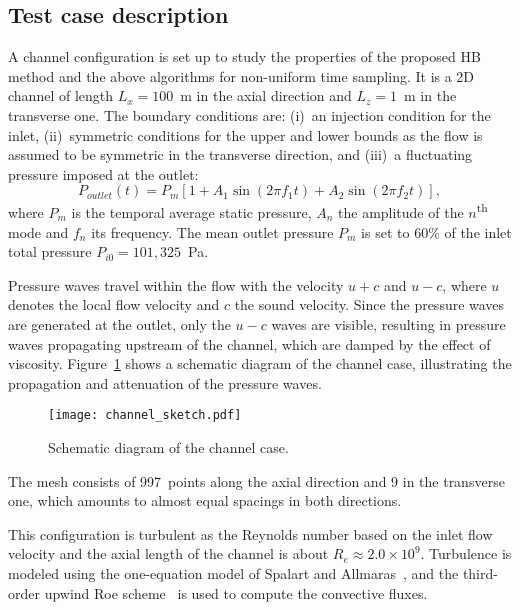 
\subsection{Test case description}
A channel configuration is set up to study the properties of the
proposed HB method and the above algorithms for non-uniform time
sampling.  It is a 2D channel of length $L_x = 100$~m in the axial
direction and $L_z = 1$~m in the transverse one.  The boundary
conditions are: (i)~an injection condition for the inlet,
(ii)~symmetric conditions for the upper and lower bounds as the flow
is assumed to be symmetric in the transverse direction, and (iii)~a
fluctuating pressure imposed at the outlet:
\begin{equation}
  P_{outlet}(t) = P_m \left[1 + A_1 \sin(2 \pi f_1 t) +
    A_2 \sin(2 \pi f_2 t) \right],
  \label{eq:outlet_canal}
\end{equation}
where $P_m$ is the temporal average static pressure, $A_n$ the
amplitude of the $n$\textsuperscript{th} mode and $f_n$ its
frequency. The mean outlet pressure $P_m$ is set to $60\%$ of the
inlet total pressure $P_{i0} = 101,325$~Pa.

Pressure waves travel within the flow with the velocity $u + c$ and $u
- c$, where $u$ denotes the local flow velocity and $c$ the sound
velocity. Since the pressure waves are generated at the outlet, only
the $u-c$ waves are visible, resulting in pressure waves propagating
upstream of the channel, which are damped by the effect of
viscosity. Figure~\ref{fig:canal_principle} shows a schematic diagram
of the channel case, illustrating the propagation and attenuation of
the pressure waves.
\begin{figure}[htb]
  \centering
  \texttt{[image: channel\_sketch.pdf]}
  \caption{Schematic diagram of the channel case.}
  \label{fig:canal_principle}
\end{figure}

The mesh consists of 997~points along the axial direction and 9 in the
transverse one, which amounts to almost equal spacings in both
directions.


This configuration is turbulent as the Reynolds number based on the
inlet flow velocity and the axial length of the channel is about $R_e
\approx 2.0 \times 10^9$.  Turbulence is modeled using the
one-equation model of Spalart and Allmaras~\cite{Spalart1992}, and the
third-order upwind Roe scheme~\cite{Roe1981} is used to compute the
convective fluxes.

